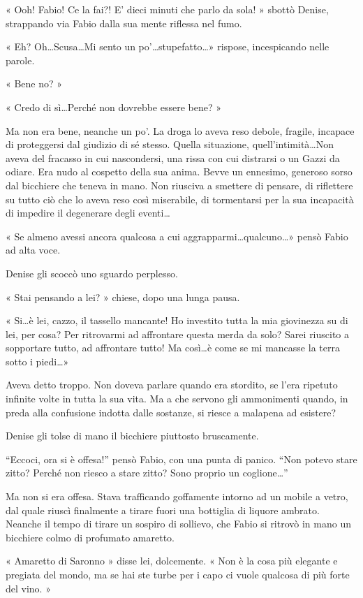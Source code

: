 « Ooh! Fabio! Ce la fai?! E' dieci minuti che parlo da sola! » sbottò Denise, strappando via Fabio dalla sua mente riflessa nel fumo.

« Eh? Oh\ldots Scusa\ldots Mi sento un po'\ldots stupefatto\ldots » rispose, incespicando nelle parole.

« Bene no? »

« Credo di sì\ldots Perché non dovrebbe essere bene? »

Ma non era bene, neanche un po'. La droga lo aveva reso debole, fragile, incapace di proteggersi dal giudizio di sé stesso. Quella situazione, quell'intimità\ldots Non aveva del fracasso in cui nascondersi, una rissa con cui distrarsi o un Gazzi da odiare. Era nudo al cospetto della sua anima. Bevve un ennesimo, generoso sorso dal bicchiere che teneva in mano. Non riusciva a smettere di pensare, di riflettere su tutto ciò che lo aveva reso così miserabile, di tormentarsi per la sua incapacità di impedire il degenerare degli eventi\ldots

« Se almeno avessi ancora qualcosa a cui aggrapparmi\ldots qualcuno\ldots » pensò Fabio ad alta voce.

Denise gli scoccò uno sguardo perplesso.

« Stai pensando a lei? » chiese, dopo una lunga pausa.

« Si\ldots è lei, cazzo, il tassello mancante! Ho investito tutta la mia giovinezza su di lei, per cosa? Per ritrovarmi ad affrontare questa merda da solo? Sarei riuscito a sopportare tutto, ad affrontare tutto! Ma così\ldots è come se mi mancasse la terra sotto i piedi\ldots »

Aveva detto troppo. Non doveva parlare quando era stordito, se l'era ripetuto infinite volte in tutta la sua vita. Ma a che servono gli ammonimenti quando, in preda alla confusione indotta dalle sostanze, si riesce a malapena ad esistere?

Denise gli tolse di mano il bicchiere piuttosto bruscamente.

``Eccoci, ora si è offesa!'' pensò Fabio, con una punta di panico. ``Non potevo stare zitto? Perché non riesco a stare zitto? Sono proprio un coglione\ldots''

Ma non si era offesa. Stava trafficando goffamente intorno ad un mobile a vetro, dal quale riuscì finalmente a tirare fuori una bottiglia di liquore ambrato. Neanche il tempo di tirare un sospiro di sollievo, che Fabio si ritrovò in mano un bicchiere colmo di profumato amaretto.

« Amaretto di Saronno » disse lei, dolcemente. « Non è la cosa più elegante e pregiata del mondo, ma se hai \textsc{}ste turbe per i\textsc{} capo ci vuole qualcosa di più forte del vino. »

